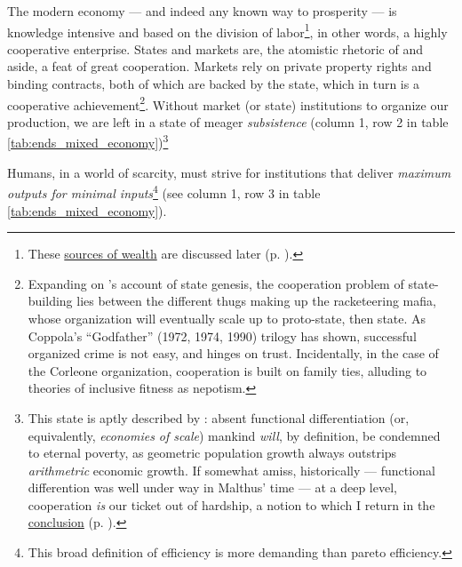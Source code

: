 The modern economy --- and indeed any known way to prosperity --- is knowledge intensive and based on the division of labor\footnote
	{These \hyperref[sec:sources_of_wealth]{sources of wealth} are discussed later (p. \pageref{sec:sources_of_wealth}).},
in other words, a highly cooperative enterprise. States and markets are, the atomistic rhetoric of \citeauthor{Hobbes-1651-aa} and \citeauthor{Smith-1776-lq} aside, a feat of great cooperation. Markets rely on private property rights and binding contracts, both of which are backed by the state, which in turn is a cooperative achievement\footnote{
	Expanding on \citeauthor{Tilly-1985-aa}'s account of state genesis, the cooperation problem of state-building lies between the different thugs making up the racketeering mafia, whose organization will eventually scale up to proto-state, then state. As Coppola's ``Godfather'' (1972, 1974, 1990) trilogy has shown, successful organized crime is not easy, and hinges on trust. Incidentally, in the case of the Corleone organization, cooperation is built on family ties, alluding to theories of inclusive fitness as nepotism.}.
Without market (or state) institutions to organize our production, we are left in a state of meager \emph{subsistence} (column 1, row 2 in table \ref{tab:ends_mixed_economy})\footnote
	{This state is aptly described by \cite{Malthus1798}: absent functional differentiation (or, equivalently, \emph{economies of scale}) mankind \emph{will}, by definition, be condemned to eternal poverty, as geometric population growth always outstrips \emph{arithmetric} economic growth. If somewhat amiss, historically --- functional differention was well under way in Malthus' time --- at a deep level, cooperation \emph{is} our ticket out of hardship, a notion to which I return in the \hyperref[sec:growth_solidarity]{conclusion} (p. \pageref{sec:growth_solidarity}).}

Humans, in a world of scarcity, must strive for institutions that deliver \emph{maximum outputs for minimal inputs}\footnote
	{This broad definition of efficiency is more demanding than pareto efficiency.} 
(see column 1, row 3 in table \ref{tab:ends_mixed_economy}).

